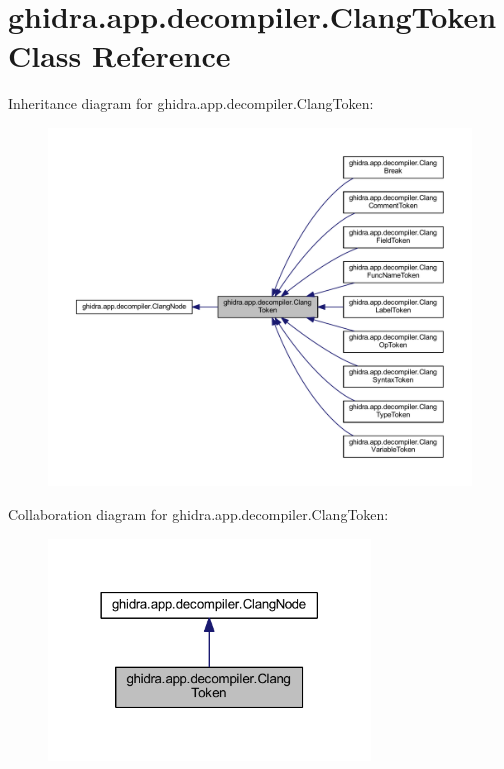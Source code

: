 \hypertarget{classghidra_1_1app_1_1decompiler_1_1_clang_token}{}\section{ghidra.\+app.\+decompiler.\+Clang\+Token Class Reference}
\label{classghidra_1_1app_1_1decompiler_1_1_clang_token}


Inheritance diagram for ghidra.\+app.\+decompiler.\+Clang\+Token\+:
\nopagebreak
\begin{figure}[H]
\begin{center}
\leavevmode
\includegraphics[width=350pt]{classghidra_1_1app_1_1decompiler_1_1_clang_token__inherit__graph}
\end{center}
\end{figure}


Collaboration diagram for ghidra.\+app.\+decompiler.\+Clang\+Token\+:
\nopagebreak
\begin{figure}[H]
\begin{center}
\leavevmode
\includegraphics[width=242pt]{classghidra_1_1app_1_1decompiler_1_1_clang_token__coll__graph}
\end{center}
\end{figure}
